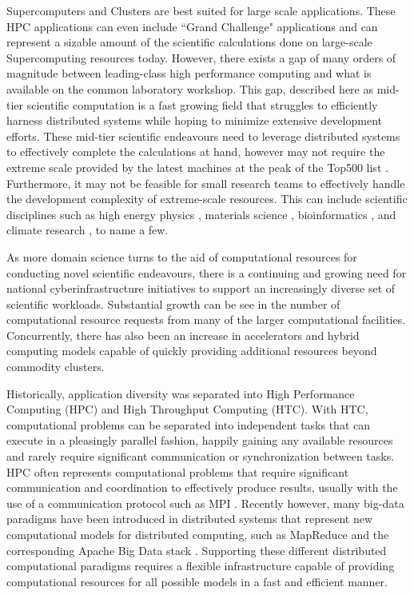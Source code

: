 Supercomputers and Clusters are best suited for large scale applications.  These HPC applications can even include ``Grand Challenge" applications \cite{hoare2005grand} and can represent a sizable amount of the scientific calculations done on large-scale Supercomputing resources today. However, there exists a gap of many orders of magnitude  between leading-class high performance computing and what is available on the common laboratory workshop. This gap, described here as mid-tier scientific computation is a fast growing field that struggles to efficiently harness distributed systems while hoping to minimize extensive development efforts. These mid-tier scientific endeavours need to leverage distributed systems to effectively complete the calculations at hand, however may not require the extreme scale provided by the latest machines at the peak of the Top500 list \cite{www-top500}. Furthermore, it may not be feasible for small research teams to effectively handle the development complexity of extreme-scale resources.  This can include scientific disciplines such as high energy physics \cite{buncic2010cernvm}, materials science \cite{wang2006survey}, bioinformatics \cite{menon2012cloud}, and climate research \cite{He2010nasa}, to name a few.  


As more domain science turns to the aid of computational resources for conducting novel scientific endeavours, there is a continuing and growing need for national cyberinfrastructure initiatives to support an increasingly diverse set of scientific workloads. Substantial growth can be see in the number of computational resource requests \cite{towns2014xsede, antypas2008nersc} from many of the larger computational facilities.  Concurrently, there has also been an increase in accelerators and hybrid computing models capable of quickly providing additional resources \cite{vetter2011keeneland} beyond commodity clusters.

Historically, application diversity was separated into High Performance Computing (HPC) and High Throughput Computing (HTC).  With HTC, computational problems can be separated into independent tasks that can execute in a pleasingly parallel fashion, happily gaining any available resources and rarely require significant communication or synchronization between tasks. HPC often represents computational problems that require significant communication and coordination to effectively produce results, usually with the use of a communication protocol such as MPI \cite{mpi}.  Recently however, many big-data paradigms \cite{agrawal2011big} have been introduced in distributed systems that represent new computational models for distributed computing, such as MapReduce \cite{dean2008mapreduce} and the corresponding Apache Big Data stack \cite{kamburugamuve2013survey, chen2014big}. Supporting these different distributed computational paradigms requires a flexible infrastructure capable of providing computational resources for all possible models in a fast and efficient manner.



